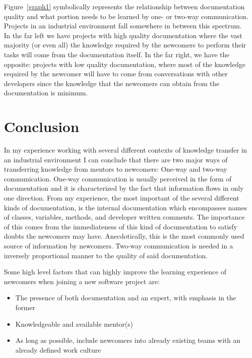 \documentclass[12pt, letterpaper]{article}
\begin{document}
Figure~\ref{graph1} symbolically represents the relationship between documentation quality and what portion needs to be learned by
one- or two-way communication. Projects in an industrial environment fall somewhere in between this spectrum. In the far left we have projects with high quality documentation where the vast
majority (or even all) the knowledge required by the newcomers to perform their tasks will come from the 
documentation itself. In the far right, we have the opposite: projects with low quality documentation, where most 
of the knowledge required by the newcomer will have to come from conversations with other developers since
the knowledge that the newcomers can obtain from the documentation is minimum.







\section{Conclusion}

In my experience working with several different contexts of knowledge transfer in an industrial environment
I can conclude that there are two major ways of transferring knowledge from mentors to newcomers: One-way
and two-way communication. One-way communication is usually perceived in the form of documentation and it 
is characterized by the fact that information flows in only one direction. From my experience, the most 
important of the several different kinds of documentation, is the internal documentation which encompasses
names of classes, variables, methods, and developer written comments. The importance of this comes from
the immediateness of this kind of documentation to satisfy doubts the newcomers may have.
Anecdotically, this is the most commonly used source of information by newcomers. 
Two-way communication is needed in a inversely 
proportional manner to the quality of said documentation.

Some high level factors that can highly improve the learning experience of newcomers when joining a new software 
project are:
\begin{itemize}
  \item The presence of both documentation and an expert, with emphasis in the former
  \item Knowledgeable and available mentor(s)
  \item As long as possible, include newcomers into already existing teams with an already defined work culture 
\end{itemize}
\end{document}
